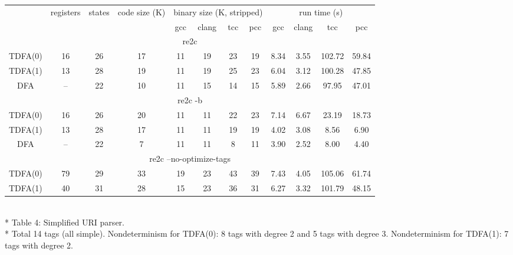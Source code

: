 \documentclass{article}
\theoremstyle{definition}
\begin{document}
\begin{center}
    \bigskip
    \begin{tabular}{|c|ccccccccccc|}
    \hline
    & registers & states & code size (K) & \multicolumn{4}{c}{binary size (K, stripped)} & \multicolumn{4}{c|}{run time (s)} \\
    & & &
        & gcc & clang & tcc & pcc
        & gcc & clang & tcc & pcc \\
    \hline \hline
    \multicolumn{12}{|c|}{re2c} \\
    \hline
    TDFA(0) & 16 & 26 & 17 & 11 & 19 & 23 & 19 & 8.34 & 3.55 & 102.72 & 59.84 \\
    TDFA(1) & 13 & 28 & 19 & 11 & 19 & 25 & 23 & 6.04 & 3.12 & 100.28 & 47.85 \\
    DFA     & -- & 22 & 10 & 11 & 15 & 14 & 15 & 5.89 & 2.66 &  97.95 & 47.01 \\
    \hline \hline
    \multicolumn{12}{|c|}{re2c -b} \\
    \hline
    TDFA(0) & 16 & 26 & 20 & 11 & 11 & 22 & 23 & 7.14 & 6.67 & 23.19 & 18.73 \\
    TDFA(1) & 13 & 28 & 17 & 11 & 11 & 19 & 19 & 4.02 & 3.08 &  8.56 &  6.90 \\
    DFA     & -- & 22 &  7 & 11 & 11 &  8 & 11 & 3.90 & 2.52 &  8.00 &  4.40 \\
    \hline \hline
    \multicolumn{12}{|c|}{re2c --no-optimize-tags} \\
    \hline
    TDFA(0) & 79 & 29 & 33 & 19 & 23 & 43 & 39 & 7.43 & 4.05 & 105.06 & 61.74 \\
    TDFA(1) & 40 & 31 & 28 & 15 & 23 & 36 & 31 & 6.27 & 3.32 & 101.79 & 48.15 \\
    \hline
    \end{tabular}\\*
    \medskip
    Table 4: Simplified URI parser.\\*
    \medskip
    \small{Total 14 tags (all simple).
    Nondeterminism for TDFA(0): 8 tags with degree 2 and 5 tags with degree 3.
    Nondeterminism for TDFA(1): 7 tags with degree 2.}
    \bigskip
\end{center}
\end{document}
